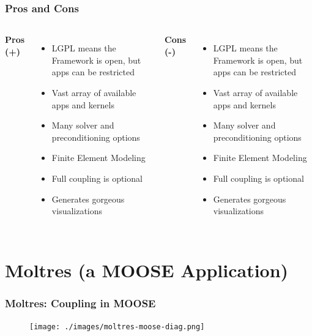 \begin{frame}
        \frametitle{Pros and Cons}
        \begin{columns}
                \column[t]{5.5cm}
                \textbf{Pros (+)}
               \begin{itemize}
               \item LGPL means the Framework is open, but apps can be restricted
               \item Vast array of available apps and kernels
               \item Many solver and preconditioning options
               \item Finite Element Modeling
               \item Full coupling is optional
               \item Generates gorgeous visualizations
               \end{itemize}
                \column[t]{5.5cm}
                \textbf{Cons (-)}
               \begin{itemize}
               \item LGPL means the Framework is open, but apps can be restricted
               \item Vast array of available apps and kernels
               \item Many solver and preconditioning options
               \item Finite Element Modeling
               \item Full coupling is optional
               \item Generates gorgeous visualizations
               \end{itemize}
        \end{columns}

\end{frame}

\section{Moltres (a MOOSE Application)}

\begin{frame}
        \frametitle{Moltres: Coupling in MOOSE}
  \begin{figure}
   \vspace{-0.05in}
   \hspace*{-0.15in}
   \texttt{[image: ./images/moltres-moose-diag.png]}
    \end{figure}
\end{frame}


